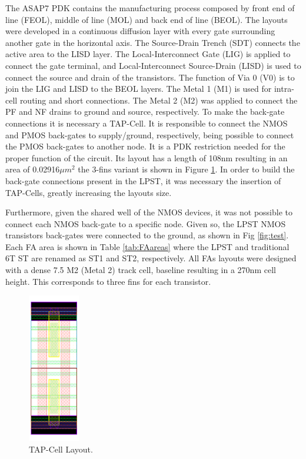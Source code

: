 \documentclass[pgmicro,mestrado,english]{iiufrgs}
\begin{document}
The ASAP7 PDK contains the manufacturing process composed by front end of line (FEOL), middle of line (MOL) and back end of line (BEOL). The layouts were developed in a continuous diffusion layer with every gate surrounding another gate in the horizontal axis. The Source-Drain Trench (SDT) connects the active area to the LISD layer. The Local-Interconnect Gate (LIG) is applied to connect the gate terminal, and Local-Interconnect Source-Drain (LISD) is used to connect the source and drain of the transistors. The function of Via 0 (V0) is to join the LIG and LISD to the BEOL layers. The Metal 1 (M1) is used for intra-cell routing and short connections. The Metal 2 (M2) was applied to connect the PF and NF drains to ground and source, respectively. To make the back-gate connections it is necessary a TAP-Cell. It is responsible to connect the NMOS and PMOS back-gates to supply/ground, respectively, being possible to connect the PMOS back-gates to another node. It is a PDK restriction needed for the proper function of the circuit. Its layout has a length of 108nm resulting in an area of 0.02916${\mu}m^{2}$ the 3-fins variant is shown in Figure \ref{tap}. In order to build the back-gate connections present in the LPST, it was necessary the insertion of TAP-Cells, greatly increasing the layouts size. 

Furthermore, given the shared well of the NMOS devices, it was not possible to connect each NMOS back-gate to a specific node. Given so, the LPST NMOS transistors back-gates were connected to the ground, as shown in Fig \ref{fig:test}. Each FA area is shown in Table \ref{tab:FAareas} where the LPST and traditional 6T ST are renamed as ST1 and ST2, respectively. All FAs layouts were designed with a dense 7.5 M2 (Metal 2) track cell, baseline resulting in a 270nm cell height. This corresponds to three fins for each transistor.

\begin{figure}[]
\centering
\includegraphics[width=0.2\textwidth]{TAP.png}
\caption{TAP-Cell Layout.}
\label{tap}
\end{figure}
\end{document}
